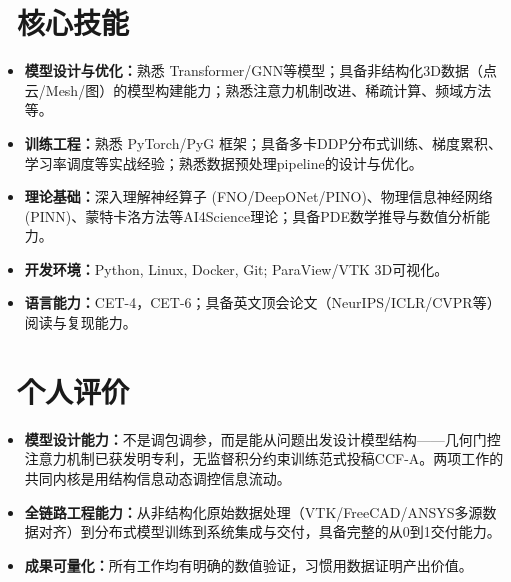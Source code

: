 \documentclass[11pt]{article}
\begin{document}
  
\section{\makebox[\widthof{\faCogs}][c]{\color{CVBlue}\faCogs}\ 核心技能}
    
\begin{itemize}
    \item \textbf{模型设计与优化：}熟悉 Transformer/GNN等模型；具备非结构化3D数据（点云/Mesh/图）的模型构建能力；熟悉注意力机制改进、稀疏计算、频域方法等。
    \item \textbf{训练工程：}熟悉 PyTorch/PyG 框架；具备多卡DDP分布式训练、梯度累积、学习率调度等实战经验；熟悉数据预处理pipeline的设计与优化。
    \item \textbf{理论基础：}深入理解神经算子 (FNO/DeepONet/PINO)、物理信息神经网络 (PINN)、蒙特卡洛方法等AI4Science理论；具备PDE数学推导与数值分析能力。
    \item \textbf{开发环境：}Python, Linux, Docker, Git; ParaView/VTK 3D可视化。
    \item \textbf{语言能力：}CET-4，CET-6；具备英文顶会论文（NeurIPS/ICLR/CVPR等）阅读与复现能力。
\end{itemize}

\section{\makebox[\widthof{\faUser}][c]{\color{CVBlue}\faUser}\ 个人评价}

\begin{itemize}
    \item \textbf{模型设计能力：}不是调包调参，而是能从问题出发设计模型结构——几何门控注意力机制已获发明专利，无监督积分约束训练范式投稿CCF-A。两项工作的共同内核是用结构信息动态调控信息流动。
    \item \textbf{全链路工程能力：}从非结构化原始数据处理（VTK/FreeCAD/ANSYS多源数据对齐）到分布式模型训练到系统集成与交付，具备完整的从0到1交付能力。
    \item \textbf{成果可量化：}所有工作均有明确的数值验证，习惯用数据证明产出价值。
\end{itemize}
\end{document}
